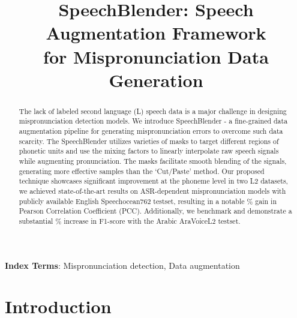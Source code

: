 \documentclass{INTERSPEECH2023}
\title{SpeechBlender: Speech Augmentation Framework \\ for Mispronunciation Data Generation}
\begin{document}
\maketitle
\begin{abstract}















The lack of labeled second language (L) speech data is a major challenge in designing mispronunciation detection models. We introduce SpeechBlender - a fine-grained data augmentation pipeline for generating mispronunciation errors to overcome such data scarcity. The SpeechBlender utilizes varieties of masks to target different regions of phonetic units and use the mixing factors to linearly interpolate raw speech signals while augmenting pronunciation. The masks facilitate smooth blending of the signals, generating more effective samples than the `Cut/Paste' method. Our proposed technique showcases significant improvement at the phoneme level in two L2 datasets, we achieved state-of-the-art results on ASR-dependent mispronunciation models with publicly available English Speechocean762 testset, resulting in a notable \% gain in Pearson Correlation Coefficient (PCC). Additionally, we benchmark and demonstrate a substantial \% increase in F1-score with the Arabic AraVoiceL2 testset.










\end{abstract}
\noindent\textbf{Index Terms}: Mispronunciation detection, Data augmentation


\section{Introduction} 
\label{sec:intro}
\end{document}
